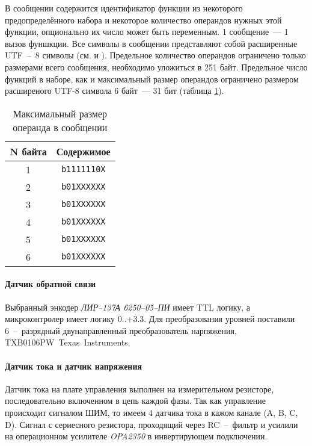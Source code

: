 В сообщении содержится идентификатор функции из некоторого предопределённого
набора и некоторое количество операндов нужных этой функции, опционально их
число может быть переменным.
1 сообщение~--- 1 вызов фуншкции.
Все символы в сообщении представляют собой расширенные UTF~--~8 символы
(см. \cite{ISO_IEC_10646_2012} и \cite{rfc3629}). Предельное количество
операндов ограничено только размерами всего сообщения, необходимо уложиться в
251 байт. Предельное число функций в наборе, как и максимальный размер операндов
ограничено размером расширеного UTF-8 символа 6 байт~--- 31 бит
(таблица \ref{max_operand_size}).

\begin{table}
    \centering
    \begin{tabular}{|c|c|}
       \hline
       N байта & Содержимое \\ \hline
       1 & \texttt{b1111110X} \\
       2 & \texttt{b01XXXXXX} \\
       3 & \texttt{b01XXXXXX} \\
       4 & \texttt{b01XXXXXX} \\
       5 & \texttt{b01XXXXXX} \\
       6 & \texttt{b01XXXXXX} \\
       \hline
    \end{tabular}
    \caption{Максимальный размер операнда в сообщении}
    \label{max_operand_size}
\end{table}

\paragraph{Датчик обратной связи}
Выбранный энкодер \textit{ЛИР--137А 6250--05--ПИ} имеет TTL логику, а
микроконтролер имеет логику 0..+3.3. Для преобразования уровней поставили
6~--~разрядный двунаправленный преобразователь нарпяжения,
\foreignlanguage{english}{TXB0106PW~Texas~Instruments}.

\paragraph{Датчик тока и датчик напряжения}
Датчик тока на плате управления выполнен на измерительном резисторе,
последовательно включенном в цепь каждой фазы. Так как управление происходит
сигналом ШИМ, то имеем 4 датчика тока в кажом канале (A, B, C, D).
Сигнал с сериесного резистора, проходящий через RC~--~фильтр и усилили на
операционном усилителе \textit{OPA2350} в инвертирующем подключении.

